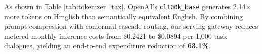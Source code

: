 As shown in Table \ref{tab:tokenizer_tax}, OpenAI's \texttt{cl100k\_base} generates 2.14$\times$ more tokens on Hinglish than semantically equivalent English. By combining prompt compression with conformal cascade routing, our serving gateway reduces metered monthly inference costs from \$0.2421 to \$0.0894 per 1,000 task dialogues, yielding an end-to-end expenditure reduction of \textbf{63.1\%}.
